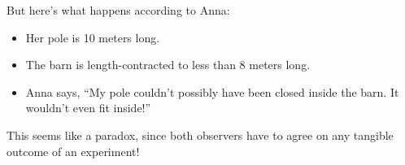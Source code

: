\medskip
But here's what happens according to Anna:
\begin{itemize}[nosep,topsep=-\parskip]
\item Her pole is 10 meters long.
\item The barn is length-contracted to less than 8 meters long.
\item Anna says, ``My pole couldn't possibly have been closed inside the barn.  It wouldn't even fit inside!''
\end{itemize}

\medskip
This seems like a paradox, since both observers have to agree on any tangible outcome of an experiment!

\medskip


